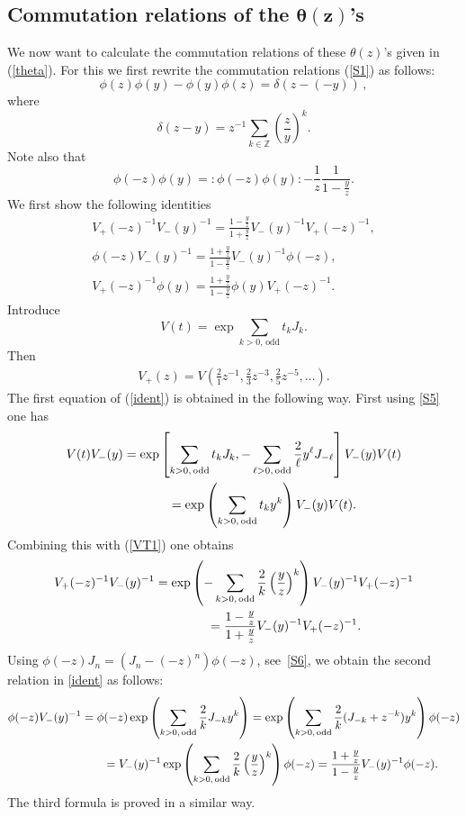 \documentclass[pdftex]{sigma}
\numberwithin{equation}{section}
\begin{document}
\subsection[Commutation relations of the $\theta(z)$'s]{Commutation relations of the $\boldsymbol{\theta(z)}$'s}

We now want to calculate the commutation relations of these
$\theta(z)$'s given in (\ref{theta}).  For this we f\/irst rewrite the commutation relations
(\ref{S1}) as follows:
\[
\phi(z)\phi(y)-\phi(y)\phi(z)=\delta(z-(-y))\,,
\]
where
\[
\delta(z-y)=z^{-1}\sum_{k\in\mathbb{Z}}
\left(\frac{z}{y}\right)^k.
\]
Note also that
\[
\phi(-z)\phi(y)={:}\phi(-z)\phi(y){:}-\frac{1}{z}\frac{1}{1-\frac{y}{z}}  .
\]
We f\/irst show the following identities
\begin{gather}
V_+(-z)^{-1}V_-(y)^{-1} =
\frac{1-\frac{y}{z}}{1+\frac{y}{z}}V_-(y)^{-1}V_+(-z)^{-1},\nonumber\\
\phi(-z)V_-(y)^{-1} =
\frac{1+\frac{y}{z}}{1-\frac{y}{z}}V_-(y)^{-1}\phi(-z),\nonumber\\
V_+(-z)^{-1}\phi(y) =
\frac{1+\frac{y}{z}}{1-\frac{y}{z}}\phi(y)V_+(-z)^{-1}.\label{ident}
\end{gather}
Introduce
\[
V(t)=\exp\sum_{k>0,\,\mathrm{odd}}t_k J_k .
\]
Then
\begin{gather}
\label{VT1}
V_+(z)=V\left(\frac21 z^{-1},\frac23 z^{-3},\frac25 z^{-5},\ldots\right) .
\end{gather}
The f\/irst equation of (\ref{ident}) is obtained in the following
way. First using \eqref{S5} one has
\begin{gather*}
V(t)V_-(y) =\exp \left[  \sum_{k>0,\,\mathrm{odd}} t_kJ_k,
- \sum_{\ell>0,\,\mathrm{odd}} \frac{2}{\ell}y^{\ell}J_{-\ell}\right]V_-(y)V(t)\\
\hphantom{V(t)V_-(y)}{}  =\exp \left(\sum_{k>0,\,\mathrm{odd}}t_{k}y^k
\right)
V_-(y)V(t)  .
\end{gather*}
Combining this with (\ref{VT1}) one obtains
\begin{gather*}
V_+(-z)^{-1}V_-(y)^{-1} =\exp \left(-\sum_{k>0,\,\mathrm{odd}} \frac{2}{k}\left(
\frac{y}{z}\right)^k\right)
V_-(y)^{-1}V_+(-z)^{-1}\\
\hphantom{V_+(-z)^{-1}V_-(y)^{-1}}{}
 =\frac{1-\frac{y}{z}}{1+\frac{y}{z}}V_-(y)^{-1}V_+(-z)^{-1}.
\end{gather*}
Using $\phi(-z)J_n=(J_n-(-z)^n)\phi(-z)$, see~\eqref{S6},
we obtain the second relation in \eqref{ident} as follows:
\begin{gather*}
\phi(-z)V_-(y)^{-1} =
\phi(-z)\exp\left(\sum_{k>0,\,\rm odd}\frac2kJ_{-k}y^k\right)
 =
\exp\left(\sum_{k>0,\,\rm odd}\frac2k(J_{-k}+z^{-k})y^k\right)\phi(-z)
\\
 \phantom{\phi(-z)V_-(y)^{-1}}{}
 =V_-(y)^{-1}\exp \left( \sum_{k>0,\,\mathrm{odd}}
\frac{2}{k}\left( \frac{y}{z}\right)^{k}\right)\phi(-z)
 =\frac{1+\frac{y}{z}}{1-\frac{y}{z}}V_-(y)^{-1}\phi(-z).
\end{gather*}
The third formula is proved in a similar way.
\end{document}
